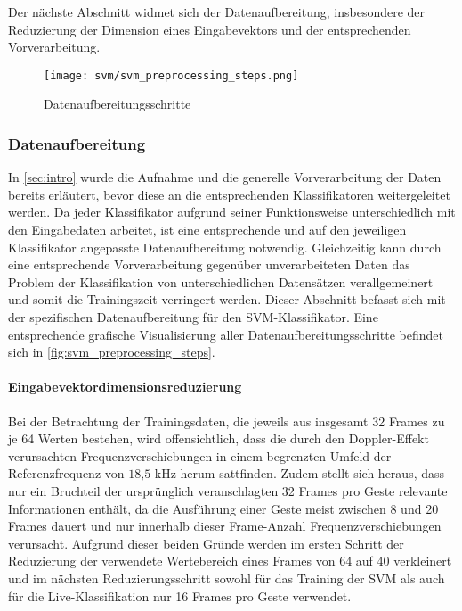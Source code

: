 Der nächste Abschnitt widmet sich der Datenaufbereitung, insbesondere der Reduzierung der Dimension eines Eingabevektors und der entsprechenden Vorverarbeitung.
\begin{figure*}[htbp] \centering
    \texttt{[image: svm/svm\_preprocessing\_steps.png]}
    \caption{Datenaufbereitungsschritte}
    \label{fig:svm_preprocessing_steps}
\end{figure*}

\subsubsection{Datenaufbereitung}\label{sec:svm_data} 
In \autoref{sec:intro} wurde die Aufnahme und die generelle Vorverarbeitung der Daten bereits erläutert, bevor diese an die entsprechenden Klassifikatoren weitergeleitet werden.
Da jeder Klassifikator aufgrund seiner Funktionsweise unterschiedlich mit den Eingabedaten arbeitet, ist eine entsprechende und auf den jeweiligen Klassifikator angepasste Datenaufbereitung notwendig.
Gleichzeitig kann durch eine entsprechende Vorverarbeitung gegenüber unverarbeiteten Daten das Problem der Klassifikation von unterschiedlichen Datensätzen verallgemeinert und somit die Trainingszeit verringert werden.
Dieser Abschnitt befasst sich mit der spezifischen Datenaufbereitung für den \ac{SVM}-Klassifikator. 
Eine entsprechende grafische Visualisierung aller Datenaufbereitungsschritte befindet sich in \autoref{fig:svm_preprocessing_steps}.
\paragraph{Eingabevektordimensionsreduzierung}\label{sec:svm_reduce}$\;$ \\
Bei der Betrachtung der Trainingsdaten, die jeweils aus insgesamt 32 Frames zu je 64 Werten bestehen, wird offensichtlich, dass die durch den Doppler-Effekt verursachten Frequenzverschiebungen in einem begrenzten Umfeld der Referenzfrequenz von $18\text{,}5\text{ kHz}$ herum sattfinden.
Zudem stellt sich heraus, dass nur ein Bruchteil der ursprünglich veranschlagten 32 Frames pro Geste relevante Informationen enthält, da die Ausführung einer Geste meist zwischen 8 und 20 Frames dauert und nur innerhalb dieser Frame-Anzahl Frequenzverschiebungen verursacht.
Aufgrund dieser beiden Gründe werden im ersten Schritt der Reduzierung der verwendete Wertebereich eines Frames von 64 auf 40 verkleinert und im nächsten Reduzierungsschritt sowohl für das Training der \ac{SVM} als auch für die Live-Klassifikation nur 16 Frames pro Geste verwendet. 

